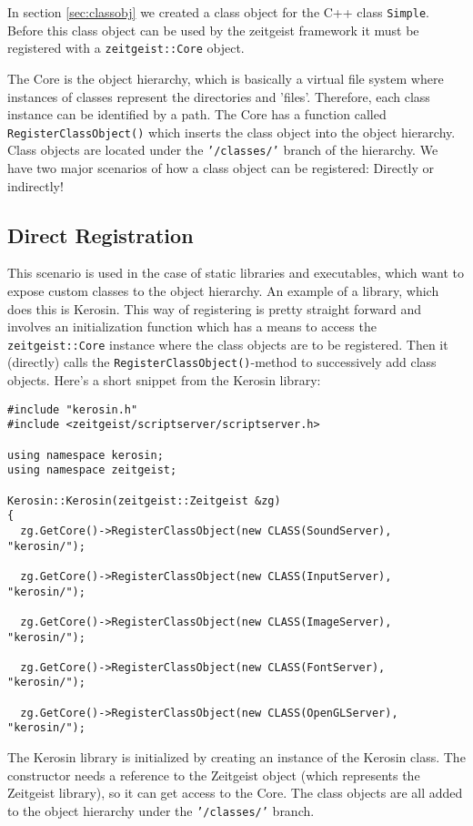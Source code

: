 In section \ref{sec:classobj} we created a class object for the C++
class \texttt{Simple}. Before this class object can be used by the
zeitgeist framework it must be registered with a
\texttt{zeitgeist::Core} object. 

The Core is the object hierarchy, which is basically a virtual file
system where instances of classes represent the directories and
'files'. Therefore, each class instance can be identified by a
path. The Core has a function called \texttt{RegisterClassObject()}
which inserts the class object into the object hierarchy. Class
objects are located under the \texttt{'/classes/'} branch of the
hierarchy. We have two major scenarios of how a class object can be
registered: Directly or indirectly!

\subsection{Direct Registration}

This scenario is used in the case of static libraries and executables,
which want to expose custom classes to the object hierarchy. An
example of a library, which does this is Kerosin. This way of
registering is pretty straight forward and involves an initialization
function which has a means to access the \texttt{zeitgeist::Core}
instance where the class objects are to be registered. Then it
(directly) calls the \texttt{RegisterClassObject()}-method to
successively add class objects. Here's a short snippet from the
Kerosin library:

\begin{verbatim}
#include "kerosin.h"
#include <zeitgeist/scriptserver/scriptserver.h>

using namespace kerosin;
using namespace zeitgeist;

Kerosin::Kerosin(zeitgeist::Zeitgeist &zg)
{
  zg.GetCore()->RegisterClassObject(new CLASS(SoundServer), "kerosin/");

  zg.GetCore()->RegisterClassObject(new CLASS(InputServer), "kerosin/");

  zg.GetCore()->RegisterClassObject(new CLASS(ImageServer), "kerosin/");

  zg.GetCore()->RegisterClassObject(new CLASS(FontServer), "kerosin/");

  zg.GetCore()->RegisterClassObject(new CLASS(OpenGLServer), "kerosin/");
\end{verbatim}

The Kerosin library is initialized by creating an instance of the
Kerosin class. The constructor needs a reference to the Zeitgeist
object (which represents the Zeitgeist library), so it can get access
to the Core. The class objects are all added to the object hierarchy
under the \texttt{'/classes/'} branch. 

